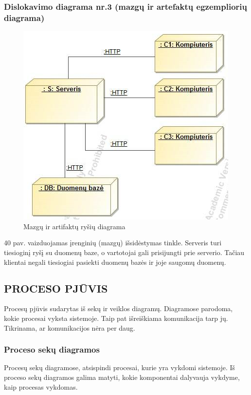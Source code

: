 \documentclass{VUMIFPSkursinis}
\begin{document}
\subsubsection{Dislokavimo diagrama nr.3 (mazgų ir artefaktų egzempliorių diagrama)}
\begin{figure}[H]
\centering
\includegraphics[scale=1, frame]{img/fizinis3.png}
\caption{Mazgų ir artifaktų ryšių diagrama}
\end{figure}
40 pav. vaizduojamas įrenginių (mazgų) išsidėstymas tinkle.  Serveris turi tiesioginį ryšį su duomenų baze, o vartotojai gali prisijungti prie serverio. Tačiau klientai negali tiesiogiai pasiekti duomenų bazės ir joje saugomų duomenų.
\newpage

\subsection{PROCESO PJŪVIS}
Procesų pjūvis sudarytas iš sekų ir veiklos diagramų. Diagramose parodoma, kokie procesai vyksta sistemoje. Taip pat išreiškiama komunikacija tarp jų. Tikrinama, ar komunikacijos nėra per daug. 
\subsubsection{Proceso sekų diagramos}
Procesų sekų diagramose, atsispindi procesai, kurie yra vykdomi sistemoje. Iš proceso sekų diagramos galima matyti, kokie komponentai dalyvauja vykdyme, kaip procesas vykdomas.
\end{document}
